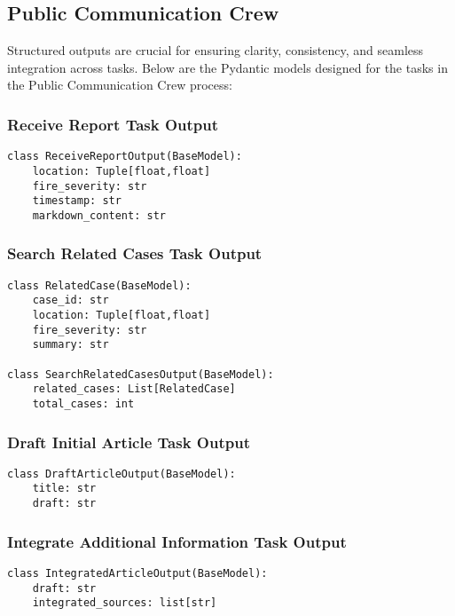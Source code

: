 \subsection{Public Communication Crew}

Structured outputs are crucial for ensuring clarity, consistency, and seamless integration across tasks. Below are the Pydantic models designed for the tasks in the Public Communication Crew process:

\subsubsection{Receive Report Task Output}
\begin{lstlisting}[caption={Pydantic model for Receive Report Task Output}]
class ReceiveReportOutput(BaseModel):
    location: Tuple[float,float]
    fire_severity: str
    timestamp: str
    markdown_content: str
\end{lstlisting}

\subsubsection{Search Related Cases Task Output}
\begin{lstlisting}[caption={Pydantic model for Search Related Cases Task Output}]
class RelatedCase(BaseModel):
    case_id: str
    location: Tuple[float,float]
    fire_severity: str
    summary: str

class SearchRelatedCasesOutput(BaseModel):
    related_cases: List[RelatedCase]
    total_cases: int
\end{lstlisting}

\subsubsection{Draft Initial Article Task Output}
\begin{lstlisting}[caption={Pydantic model for Draft Initial Article Task Output}]
class DraftArticleOutput(BaseModel):
    title: str
    draft: str
\end{lstlisting}

\subsubsection{Integrate Additional Information Task Output}
\begin{lstlisting}[caption={Pydantic model for Integrate Additional Information Task Output}]
class IntegratedArticleOutput(BaseModel):
    draft: str
    integrated_sources: list[str]
\end{lstlisting}

